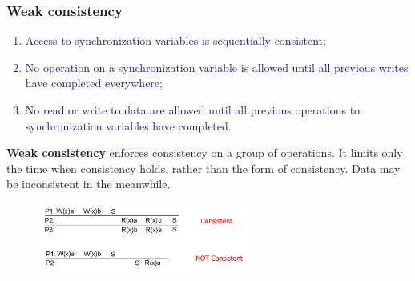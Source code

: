 \documentclass[10pt,a4paper]{article}
\begin{document}
\subsubsection{Weak consistency}
\textcolor{MidnightBlue}{
\begin{enumerate}
	\item Access to synchronization variables is sequentially consistent;
	\item No operation on a synchronization variable is allowed until all previous writes have completed everywhere;
	\item No read or write to data are allowed until all previous operations to synchronization variables have completed.
\end{enumerate}}
\textbf{Weak consistency} enforces consistency on a group of operations. It limits only the time when consistency holds, rather than the form of consistency. Data may be inconsistent in the meanwhile.
\begin{figure}[h!]
 \hfill \includegraphics[width=200pt]{images/weak.png}\hspace*{\fill}
  \label{fig:weak}
\end{figure}
\end{document}
